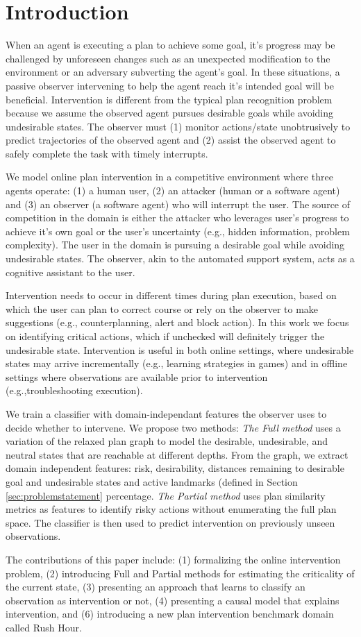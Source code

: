 \section{Introduction}\label{sec:intro}
When an agent is executing a plan to achieve some goal, it’s progress may be challenged by unforeseen changes such as an unexpected modification to the environment or an adversary subverting the agent’s
goal. In these situations, a passive observer intervening to help the agent reach it’s intended goal will be beneficial. Intervention is
different from the typical plan recognition problem because we assume the observed agent pursues desirable goals while avoiding undesirable states. The observer must (1) monitor actions/state unobtrusively to predict trajectories of the observed agent and (2) assist the observed agent to safely complete the task with timely interrupts.

We model online plan intervention in a competitive environment where three agents operate: (1) a human user, (2) an attacker (human or a software agent) and (3) an observer (a software agent) who will interrupt the user. The source of competition in the domain is either the attacker who leverages user's progress to achieve it's own goal or the user's uncertainty (e.g., hidden information, problem complexity). The user in the domain is pursuing a desirable goal while avoiding undesirable states. The observer, akin to the automated support system, acts as a cognitive assistant to the user.

Intervention needs to occur in different times during plan execution, based on which the user can plan to correct course or rely on the observer to make suggestions (e.g., counterplanning, alert and block action). In this work we focus on identifying critical actions, which if unchecked will definitely trigger the undesirable state. Intervention is useful in both online settings, where undesirable states may arrive incrementally (e.g., learning strategies in games) and in offline settings where observations are available prior to intervention (e.g.,troubleshooting execution).

We train a classifier with domain-independant features the observer uses to decide whether to intervene. We propose two methods: \textit{The Full method} uses a variation of the relaxed plan graph \cite{blum1997fast} to model the desirable, undesirable, and neutral states that are reachable at different depths. From the graph, we extract domain independent features: risk, desirability, distances remaining to desirable goal and undesirable states and  active landmarks (defined in Section \ref{sec:problemstatement} percentage. \textit{The Partial method} uses plan similarity metrics as features to identify risky actions without enumerating the full plan space. The classifier is then used to predict intervention on previously unseen observations.


The contributions of this paper include: (1) formalizing the online intervention problem, (2) introducing Full and Partial methods for estimating the criticality of the current state, (3) presenting an approach that learns to classify an observation as intervention or not, (4) presenting a causal model that explains intervention, and (6) introducing a new plan intervention benchmark domain called Rush Hour.
